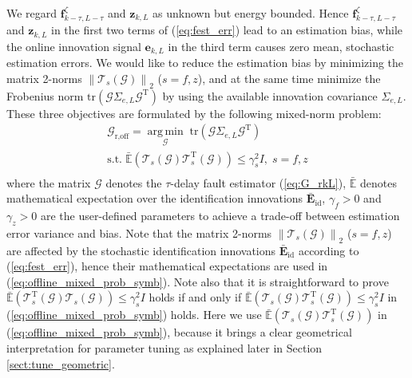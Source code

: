\documentclass[twocolumn]{autart}
\DeclareMathOperator*{\argmin}{\arg\,\min}
\begin{document}
We regard $\mathbf{f}_{k-\tau,L-\tau}^\zeta$ and $\mathbf{z}_{k,L}$ as unknown but energy bounded.
Hence $\mathbf{f}_{k-\tau,L-\tau}^\zeta$ and $\mathbf{z}_{k,L}$ in the first two terms of (\ref{eq:fest_err}) lead to an estimation bias, while the online innovation signal $\mathbf{e}_{k,L}$ in the third term causes zero mean, stochastic estimation errors. We would like to reduce the estimation bias by minimizing the matrix 2-norms $\left\| {\mathcal{T}}_{s} \left( \mathcal{G} \right) \right\|_2$ ($s=f,z$), and at the same time
minimize the Frobenius norm $\mathrm{tr} \left( \mathcal{G} \Sigma_{e,L} \mathcal{G}^\mathrm{T} \right)$ by using the available innovation covariance $\Sigma_{e,L}$. These three objectives are formulated by the following mixed-norm problem:
\begin{equation}\label{eq:offline_mixed_prob_symb}
\begin{array}{c}
\mathcal{G}_{\text{r,off}} = \argmin\limits_{\mathcal{G}}\; \mathrm{tr} \left( \mathcal{G} \Sigma_{e,L} \mathcal{G}^\mathrm{T} \right) \\
\mathrm{s.t.}\; \mathbb{\bar E} \left( {\mathcal{T}}_{s} \left( \mathcal{G} \right) {\mathcal{T}}_{s}^\text{T} \left( \mathcal{G} \right) \right) \leq \gamma_s^2 I, \; s=f, z \\
\end{array}
\end{equation}
where the matrix $\mathcal{G}$ denotes the $\tau$-delay fault estimator (\ref{eq:G_rkL}), $\mathbb{\bar E}$ denotes mathematical expectation over the identification innovations $\mathbf{\bar E}_{\mathrm{id}}$, $\gamma_f >0$ and $\gamma_z >0$ are the user-defined parameters to achieve a trade-off between estimation error variance and bias. Note that the matrix 2-norms $\left\| {\mathcal{T}}_{s} \left( \mathcal{G} \right) \right\|_2$ ($s=f,z$) are affected by the stochastic identification innovations $\mathbf{\bar E}_{\mathrm{id}}$ according to (\ref{eq:fest_err}), hence their mathematical expectations are used in (\ref{eq:offline_mixed_prob_symb}). 
Note also that it is straightforward to prove $\mathbb{\bar E} \left( {\mathcal{T}}_{s}^\mathrm{T} \left( \mathcal{G} \right) {\mathcal{T}}_{s} \left( \mathcal{G} \right) \right) \leq \gamma_s^2 I$ holds if and only if $\mathbb{\bar E} \left( {\mathcal{T}}_{s} \left( \mathcal{G} \right) {\mathcal{T}}_{s}^\mathrm{T} \left( \mathcal{G} \right) \right) \leq \gamma_s^2 I$ in (\ref{eq:offline_mixed_prob_symb}) holds. Here we use 
$\mathbb{\bar E} \left( {\mathcal{T}}_{s} \left( \mathcal{G} \right) {\mathcal{T}}_{s}^\mathrm{T} \left( \mathcal{G} \right) \right)$ in (\ref{eq:offline_mixed_prob_symb}), because it brings a clear geometrical interpretation for parameter tuning as explained later in Section \ref{sect:tune_geometric}.
\end{document}
